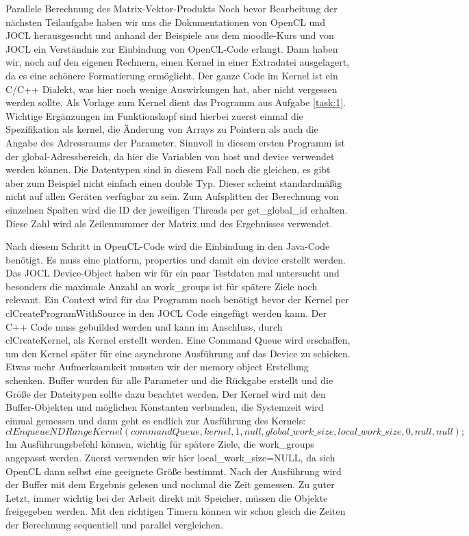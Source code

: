 \documentclass[
ngerman,
subtask=ruled %
]{tudaexercise}
\begin{document}
	
	\begin{task}{Parallele Berechnung des Matrix-Vektor-Produkts}
		Noch bevor Bearbeitung der nächsten Teilaufgabe haben wir uns die Dokumentationen von OpenCL und JOCL herausgesucht und anhand der Beispiele aus dem moodle-Kurs und von JOCL ein Verständnis zur Einbindung von OpenCL-Code erlangt.
		Dann haben wir, noch auf den eigenen Rechnern, einen Kernel in einer Extradatei ausgelagert, da es eine schönere Formatierung ermöglicht.
		Der ganze Code im Kernel ist ein C/C++ Dialekt, was hier noch wenige Auswirkungen hat, aber nicht vergessen werden sollte.
		Als Vorlage zum Kernel dient das Programm aus Aufgabe \ref{task:1}. Wichtige Ergänzungen im Funktionskopf sind hierbei zuerst einmal die Spezifikation als kernel, die Änderung von Arrays zu Pointern als auch die Angabe des Adressraums der Parameter.
		Sinnvoll in diesem ersten Programm ist der global-Adressbereich, da hier die Variablen von host und device verwendet werden können.
		Die Datentypen sind in diesem Fall noch die gleichen, es gibt aber zum Beispiel nicht einfach einen double Typ. Dieser scheint standardmäßig nicht auf allen Geräten verfügbar zu sein.
		Zum Aufsplitten der Berechnung von einzelnen Spalten wird die ID der jeweiligen Threads per get\_global\_id erhalten.
		Diese Zahl wird als Zeilennummer der Matrix und des Ergebnisses verwendet.
		
		Nach diesem Schritt in OpenCL-Code wird die Einbindung in den Java-Code benötigt.
		Es muss eine platform, properties und damit ein device erstellt werden. Das JOCL Device-Object haben wir für ein paar Testdaten mal untersucht und besonders die maximale Anzahl an work\_groups ist für spätere Ziele noch relevant.
		Ein Context wird für das Programm noch benötigt bevor der Kernel per clCreateProgramWithSource in den JOCL Code eingefügt werden kann.
		Der C++ Code muss gebuilded werden und kann im Anschluss, durch clCreateKernel, als Kernel erstellt werden.
		Eine Command Queue wird erschaffen, um den Kernel später für eine asynchrone Ausführung auf das Device zu schicken.
		Etwas mehr Aufmerksamkeit mussten wir der memory object Erstellung schenken. Buffer wurden für alle Parameter und die Rückgabe erstellt und die Größe der Dateitypen sollte dazu beachtet werden.
		Der Kernel wird mit den Buffer-Objekten und möglichen Konstanten verbunden, die Systemzeit wird einmal gemessen und dann geht es endlich zur Ausführung des Kernels:
		$clEnqueueNDRangeKernel(commandQueue, kernel, 1, null,
		global\_work\_size, local\_work\_size,
		0, null, null);$
		Im Ausführungsbefehl können, wichtig für spätere Ziele, die work\_groups angepasst werden. Zuerst verwenden wir hier local\_work\_size=NULL, da sich OpenCL dann selbst eine geeignete Größe bestimmt.
		Nach der Ausführung wird der Buffer mit dem Ergebnis gelesen und nochmal die Zeit gemessen.
		Zu guter Letzt, immer wichtig bei der Arbeit direkt mit Speicher, müssen die Objekte freigegeben werden.
		Mit den richtigen Timern können wir schon gleich die Zeiten der Berechnung sequentiell und parallel vergleichen.
	\end{task}
	
\end{document}
